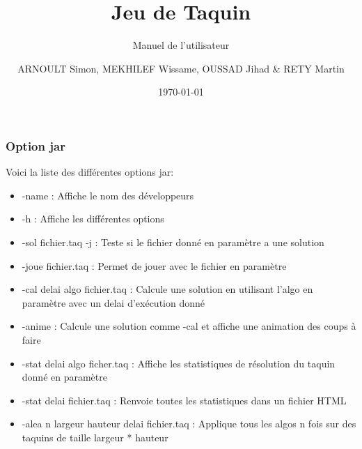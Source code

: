 \documentclass{beamer}
\title{Jeu de Taquin}
\subtitle{Manuel de l'utilisateur}
\author{ARNOULT Simon, MEKHILEF Wissame, OUSSAD Jihad \& RETY Martin}
\institute{Université d'Orléans}
\date{\today}
\begin{document}
  \begin{frame}
   \titlepage
  \end{frame}

  \begin{frame}
   \frametitle{Option jar}
	Voici la liste des différentes options jar:
	\begin{itemize}
	\item -name : Affiche le nom des développeurs
	\item -h : Affiche les différentes options
	\item -sol fichier.taq -j : Teste si le fichier donné en paramètre a une solution
	\item -joue fichier.taq : Permet de jouer avec le fichier en paramètre
	\item -cal delai algo fichier.taq : Calcule une solution en utilisant l'algo en paramètre avec un delai d'exécution donné
	\item -anime : Calcule une solution comme -cal et affiche une animation des coups à faire
	\item -stat delai algo ficher.taq : Affiche les statistiques de résolution du taquin donné en paramètre
	\item -stat delai fichier.taq : Renvoie toutes les statistiques dans un fichier HTML
	\item -alea n largeur hauteur delai fichier.taq : Applique tous les algos n fois sur des taquins de taille largeur * hauteur
	\end{itemize}
   \end{frame}
   
\end{document}
